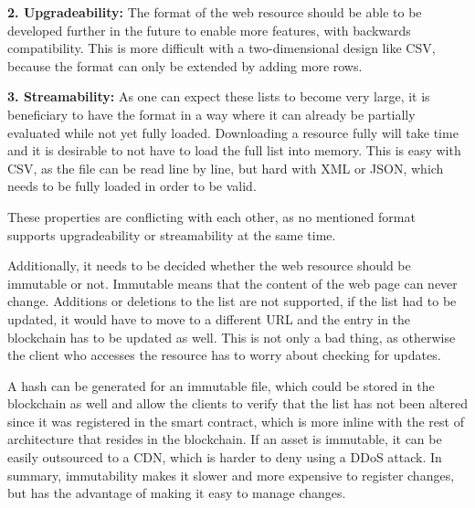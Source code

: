 \textbf{2. Upgradeability:} The format of the web resource should be able to be developed further in the future to enable more features, with backwards compatibility. This is more difficult with a two-dimensional design like CSV, because the format can only be extended by adding more rows.

\textbf{3. Streamability:} As one can expect these lists to become very large, it is beneficiary to have the format in a way where it can already be partially evaluated while not yet fully loaded. Downloading a resource fully will take time and it is desirable to not have to load the full list into memory. This is easy with CSV, as the file can be read line by line, but hard with XML or JSON, which needs to be fully loaded in order to be valid.

These properties are conflicting with each other, as no mentioned format supports upgradeability or streamability at the same time.

Additionally, it needs to be decided whether the web resource should be immutable or not. Immutable means that the content of the web page can never change. Additions or deletions to the list are not supported, if the list had to be updated, it would have to move to a different URL and the entry in the blockchain has to be updated as well. This is not only a bad thing, as otherwise the client who accesses the resource has to worry about checking for updates.

A hash can be generated for an immutable file, which could be stored in the blockchain as well and allow the clients to verify that the list has not been altered since it was registered in the smart contract, which is more inline with the rest of architecture that resides in the blockchain. If an asset is immutable, it can be easily outsourced to a CDN, which is harder to deny using a DDoS attack.
In summary, immutability makes it slower and more expensive to register changes, but has the advantage of making it easy to manage changes.
